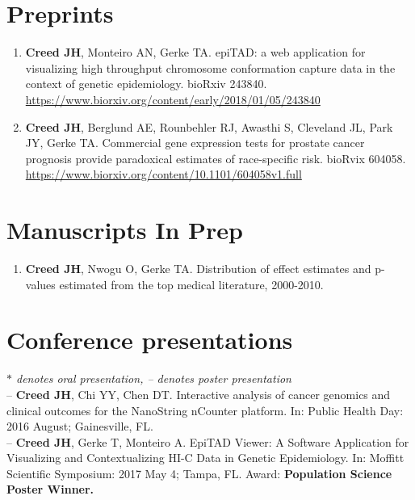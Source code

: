 \documentclass[11pt, a4paper]{article} %
\begin{document}
\section*{Preprints}
\begin{enumerate}[leftmargin=*]

\item{} {\bf Creed JH}, Monteiro AN, Gerke TA. epiTAD: a web application for visualizing high throughput chromosome conformation capture data in the context of genetic epidemiology. bioRxiv 243840. \href{https://www.biorxiv.org/content/early/2018/01/05/243840}{https://www.biorxiv.org/content/early/2018/01/05/243840}

\item{} {\bf Creed JH}, Berglund AE, Rounbehler RJ, Awasthi S, Cleveland JL, Park JY, Gerke TA. Commercial gene expression tests for prostate cancer prognosis provide  paradoxical estimates of race-specific risk. bioRvix 604058. \\\href{https://www.biorxiv.org/content/10.1101/604058v1.full}{https://www.biorxiv.org/content/10.1101/604058v1.full}

\end{enumerate}

\section*{Manuscripts In Prep}
\begin{enumerate}[leftmargin=*]

\item{} {\bf Creed JH}, Nwogu O, Gerke TA. Distribution of effect estimates and p-values estimated from the top medical literature, 2000-2010. 

\end{enumerate}

\section*{Conference presentations}
\vspace{-.3cm}
{\footnotesize\emph{$*$ denotes oral presentation, -- denotes poster presentation}}\\

-- {\bf Creed JH}, Chi YY, Chen DT. Interactive analysis of cancer genomics and clinical outcomes for the NanoString nCounter platform. In: Public Health Day: 2016 August; Gainesville, FL.\\

-- {\bf Creed JH}, Gerke T, Monteiro A. EpiTAD Viewer: A Software Application for Visualizing and Contextualizing HI-C Data in Genetic Epidemiology. In: Moffitt Scientific Symposium: 2017 May 4; Tampa, FL. Award: {\bf Population Science Poster Winner.}\\
\end{document}
